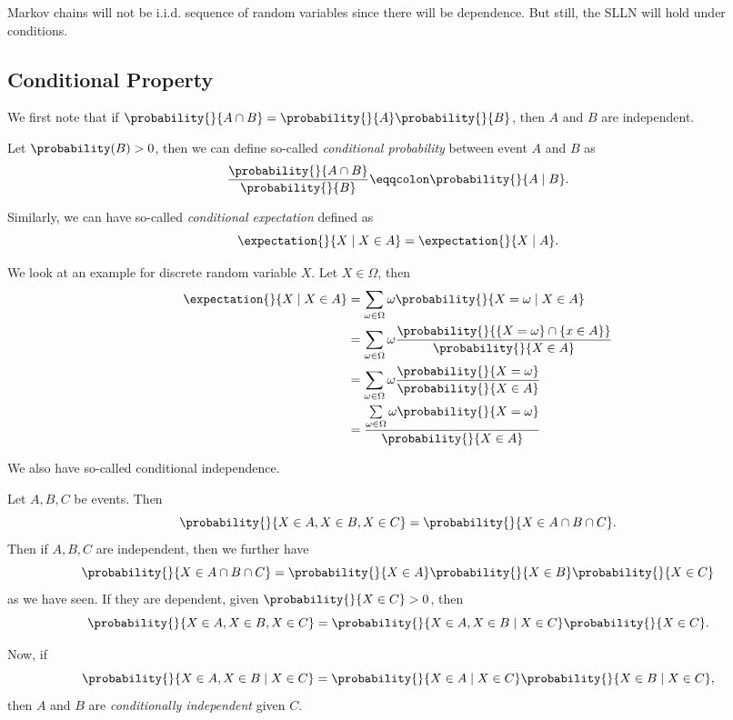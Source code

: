 \begin{note}
	Markov chains will not be i.i.d. sequence of random variables since there will be dependence. But still, the SLLN will hold under conditions.
\end{note}

\subsection{Conditional Property}
\begin{prev}
	We first note that if \(\probability{}{A\cap B} = \probability{}{A} \probability{}{B} \), then \(A\) and \(B\) are independent.
\end{prev}

\begin{definition}
	Let \(\probability(B)>0\), then we can define so-called \emph{conditional probability} between event \(A\) and \(B\) as
	\[
		\frac{\probability{}{A\cap B}}{\probability{}{B}} \eqqcolon \probability{}{A \mid B}.
	\]
\end{definition}

\begin{definition}
	Similarly, we can have so-called \emph{conditional expectation} defined as
	\[
		\expectation{}{X \mid X\in A} = \expectation{}{X \mid A}.
	\]
\end{definition}

\begin{eg}
	We look at an example for discrete random variable \(X\). Let \(X\in \Omega\), then
	\[
		\begin{split}
			\expectation{}{X \mid X\in A} &= \sum\limits_{\omega\in \Omega} \omega\probability{}{X = \omega \mid X\in A}\\
			&=\sum\limits_{\omega\in \Omega} \omega \frac{\probability{}{\left\{X = \omega\right\}\cap \left\{x\in A\right\}}}{\probability{}{X\in A} }\\
			&=\sum\limits_{\omega\in \Omega} \omega \frac{\probability{}{X = \omega}}{\probability{}{X\in A} }\\
			&=\frac{\sum\limits_{\omega\in \Omega} \omega \probability{}{X = \omega}}{\probability{}{X\in A}}
		\end{split}
	\]
\end{eg}

We also have so-called conditional independence.
\begin{definition}
	Let \(A, B, C\) be events. Then
	\[
		\probability{}{X\in A, X\in B, X\in C} = \probability{}{X\in A\cap B\cap C}.
	\]
	Then if \(A, B,  C\) are independent, then we further have
	\[
		\probability{}{X\in A\cap B\cap C}= \probability{}{X\in A}\probability{}{X\in B}\probability{}{X\in C}
	\]
	as we have seen. If they are dependent, given \(\probability{}{X\in C}>0\), then
	\[
		\probability{}{X\in A, X\in B, X\in C} = \probability{}{X\in A, X\in B \mid X\in C}\probability{}{X\in C}.
	\]

	Now, if
	\[
		\probability{}{X\in A, X\in B \mid X\in C} = \probability{}{X\in A \mid X\in C}\probability{}{X\in B \mid X\in C},
	\]
	then \(A\) and \(B\) are \emph{conditionally independent} given \(C\).
\end{definition}

